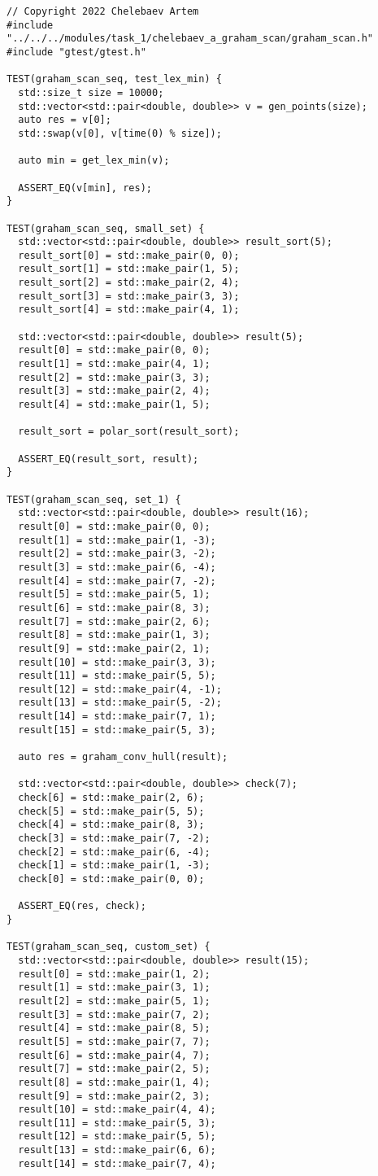 \documentclass{report}
\begin{document}
\begin{lstlisting}
// Copyright 2022 Chelebaev Artem
#include "../../../modules/task_1/chelebaev_a_graham_scan/graham_scan.h"
#include "gtest/gtest.h"

TEST(graham_scan_seq, test_lex_min) {
  std::size_t size = 10000;
  std::vector<std::pair<double, double>> v = gen_points(size);
  auto res = v[0];
  std::swap(v[0], v[time(0) % size]);

  auto min = get_lex_min(v);

  ASSERT_EQ(v[min], res);
}

TEST(graham_scan_seq, small_set) {
  std::vector<std::pair<double, double>> result_sort(5);
  result_sort[0] = std::make_pair(0, 0);
  result_sort[1] = std::make_pair(1, 5);
  result_sort[2] = std::make_pair(2, 4);
  result_sort[3] = std::make_pair(3, 3);
  result_sort[4] = std::make_pair(4, 1);

  std::vector<std::pair<double, double>> result(5);
  result[0] = std::make_pair(0, 0);
  result[1] = std::make_pair(4, 1);
  result[2] = std::make_pair(3, 3);
  result[3] = std::make_pair(2, 4);
  result[4] = std::make_pair(1, 5);

  result_sort = polar_sort(result_sort);

  ASSERT_EQ(result_sort, result);
}

TEST(graham_scan_seq, set_1) {
  std::vector<std::pair<double, double>> result(16);
  result[0] = std::make_pair(0, 0);
  result[1] = std::make_pair(1, -3);
  result[2] = std::make_pair(3, -2);
  result[3] = std::make_pair(6, -4);
  result[4] = std::make_pair(7, -2);
  result[5] = std::make_pair(5, 1);
  result[6] = std::make_pair(8, 3);
  result[7] = std::make_pair(2, 6);
  result[8] = std::make_pair(1, 3);
  result[9] = std::make_pair(2, 1);
  result[10] = std::make_pair(3, 3);
  result[11] = std::make_pair(5, 5);
  result[12] = std::make_pair(4, -1);
  result[13] = std::make_pair(5, -2);
  result[14] = std::make_pair(7, 1);
  result[15] = std::make_pair(5, 3);

  auto res = graham_conv_hull(result);

  std::vector<std::pair<double, double>> check(7);
  check[6] = std::make_pair(2, 6);
  check[5] = std::make_pair(5, 5);
  check[4] = std::make_pair(8, 3);
  check[3] = std::make_pair(7, -2);
  check[2] = std::make_pair(6, -4);
  check[1] = std::make_pair(1, -3);
  check[0] = std::make_pair(0, 0);

  ASSERT_EQ(res, check);
}

TEST(graham_scan_seq, custom_set) {
  std::vector<std::pair<double, double>> result(15);
  result[0] = std::make_pair(1, 2);
  result[1] = std::make_pair(3, 1);
  result[2] = std::make_pair(5, 1);
  result[3] = std::make_pair(7, 2);
  result[4] = std::make_pair(8, 5);
  result[5] = std::make_pair(7, 7);
  result[6] = std::make_pair(4, 7);
  result[7] = std::make_pair(2, 5);
  result[8] = std::make_pair(1, 4);
  result[9] = std::make_pair(2, 3);
  result[10] = std::make_pair(4, 4);
  result[11] = std::make_pair(5, 3);
  result[12] = std::make_pair(5, 5);
  result[13] = std::make_pair(6, 6);
  result[14] = std::make_pair(7, 4);


\end{lstlisting}
\end{document}
